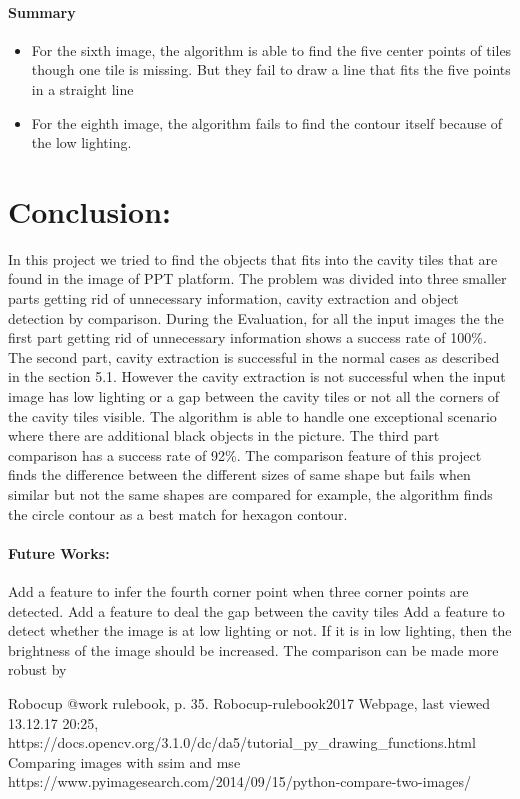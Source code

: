 \documentclass{article}
\begin{document}
\paragraph{Summary}
\begin{itemize}
\item For the sixth image, the algorithm is able to find the five center points of tiles though one tile is missing. But they fail to draw a line that fits the five points in a straight line
\item For the eighth image, the algorithm fails to find the contour itself because of the low lighting.

\end{itemize}

\newpage
\section{Conclusion:}

 In this project we tried to find the objects that fits into the cavity tiles that are found in the image of PPT platform. 
 The problem was divided into three smaller parts getting rid of unnecessary information, cavity extraction and object detection by comparison.
 During the Evaluation, for all the input images the the first part getting rid of unnecessary information shows a success rate of 100\%.
 The second part, cavity extraction is successful in the normal cases as described in the section 5.1. However the cavity extraction is not successful when the input image has low lighting or a gap between the cavity tiles or not all the corners of the cavity tiles visible.
 The algorithm is able to handle one exceptional scenario where there are additional black objects in the picture.
 The third part comparison has a success rate of 92\%. The comparison feature of this project finds the difference between the different sizes of same shape but fails when similar but not the same shapes are compared for example, the algorithm finds the circle contour as a best match for hexagon contour. 
 \paragraph*{Future Works:}
 Add a feature to infer the fourth corner point when three corner points are detected.
 Add a feature to deal the gap between the cavity tiles
 Add a feature to detect whether the image is at low lighting or not. If it is in low lighting, then the brightness of the image should be increased.
 The comparison can be made more robust by 


\begin{thebibliography}{99}
	 Robocup @work rulebook, p. 35. Robocup-rulebook2017
	 Webpage, last viewed 13.12.17 20:25, https://docs.opencv.org/3.1.0/dc/da5/tutorial\_py\_drawing\_functions.html
	 Comparing images with ssim and mse \\ https://www.pyimagesearch.com/2014/09/15/python-compare-two-images/
	\end{thebibliography}
\end{document}
